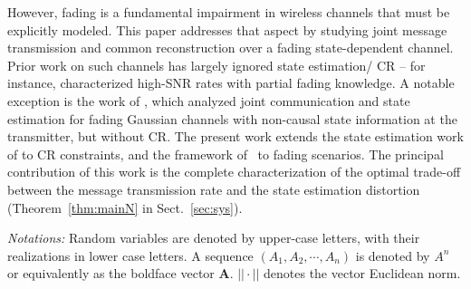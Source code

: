 \documentclass[journal]{IEEEtran}
\begin{document}
However, fading is a fundamental impairment in wireless channels that must be explicitly modeled. This paper addresses that aspect by studying joint message transmission and common reconstruction over a fading state-dependent channel. Prior work on such channels has largely ignored state estimation/ CR -- for instance, \cite{vaze2008dirty} characterized high-SNR rates with partial fading knowledge. A notable exception is the work of \cite{ramachandran2021joint}, which analyzed joint communication and state estimation for fading Gaussian channels with non-causal state information at the transmitter, but without CR. The present work extends the state estimation work of \cite{ramachandran2021joint} to CR constraints, and the framework of~\cite{steinberg2009coding} to fading scenarios. The principal contribution of this work is the complete characterization of the optimal trade-off between the message transmission rate and the state estimation distortion (Theorem~\ref{thm:mainN} in Sect.~\ref{sec:sys}). 

\emph{Notations:} Random variables are denoted by upper-case letters, with their realizations in lower case letters. %
A sequence $(A_1,A_2,\cdots,A_n)$ is denoted by $A^n$ or equivalently as the boldface vector $\mathbf{A}$. $||\cdot||$ denotes the vector Euclidean norm.
\end{document}
